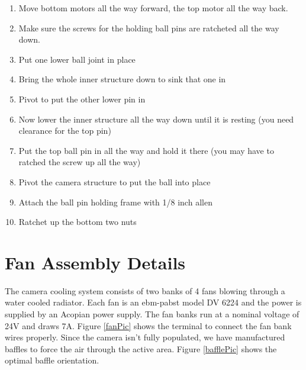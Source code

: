 \documentclass[11pt]{article}
\begin{document}
\begin{enumerate}
\item Move bottom motors all the way forward, the top motor all the way back.
\item Make sure the screws for the holding ball pins are ratcheted all the way down.
\item Put one lower ball joint in place
\item Bring the whole inner structure down to sink that one in
\item Pivot to put the other lower pin in
\item Now lower the inner structure all the way down until it is resting (you need clearance for the top pin)
\item Put the top ball pin in all the way and hold it there (you may have to ratched the screw up all the way)
\item Pivot the camera structure to put the ball into place 
\item Attach the ball pin holding frame with 1/8 inch allen
\item Ratchet up the bottom two nuts
\end{enumerate}





\section{Fan Assembly Details}

The camera cooling system consists of two banks of 4 fans blowing through a water cooled radiator.
Each fan is an ebm-pabst model DV 6224 and the power is supplied by an Acopian power supply.
The fan banks run at a nominal voltage of 24V and draws 7A.
Figure \ref{fanPic} shows the terminal to connect the fan bank wires properly.
Since the camera isn't fully populated, we have manufactured baffles to force the air through the active area. 
Figure \ref{bafflePic} shows the optimal baffle orientation.
\end{document}
